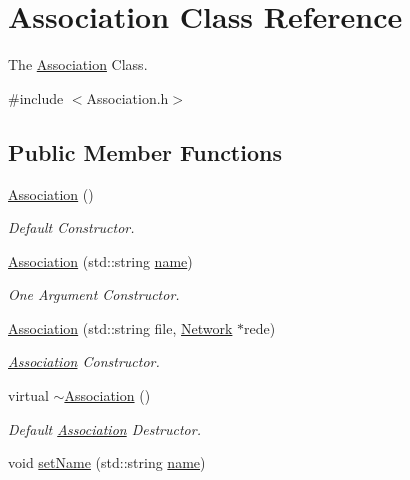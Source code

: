 \hypertarget{classAssociation}{}\section{Association Class Reference}
\label{classAssociation}


The \mbox{\hyperlink{classAssociation}{Association}} Class.  




{\ttfamily \#include $<$Association.\+h$>$}

\subsection*{Public Member Functions}
\begin{DoxyCompactItemize}
\item 
\mbox{\hyperlink{classAssociation_abf287524f5ab9abf66059e5fa959340b}{Association}} ()
\begin{DoxyCompactList}\small\item\em Default Constructor. \end{DoxyCompactList}\item 
\mbox{\hyperlink{classAssociation_a0773254cf0a1377e144a39b36c99d74d}{Association}} (std\+::string \mbox{\hyperlink{classAssociation_a165477d8d99c99a659d2f193b39ba1f8}{name}})
\begin{DoxyCompactList}\small\item\em One Argument Constructor. \end{DoxyCompactList}\item 
\mbox{\hyperlink{classAssociation_aaf75146fc564138ae2ae2430eb7926a2}{Association}} (std\+::string file, \mbox{\hyperlink{classNetwork}{Network}} $\ast$rede)
\begin{DoxyCompactList}\small\item\em \mbox{\hyperlink{classAssociation}{Association}} Constructor. \end{DoxyCompactList}\item 
virtual \mbox{\hyperlink{classAssociation_adc0ad6a21b904d08c1d392550df9da59}{$\sim$\+Association}} ()
\begin{DoxyCompactList}\small\item\em Default \mbox{\hyperlink{classAssociation}{Association}} Destructor. \end{DoxyCompactList}\item 
void \mbox{\hyperlink{classAssociation_a8bd23fd6c727963237bf85a6374ab6d8}{set\+Name}} (std\+::string \mbox{\hyperlink{classAssociation_a165477d8d99c99a659d2f193b39ba1f8}{name}})

\end{DoxyCompactItemize}
